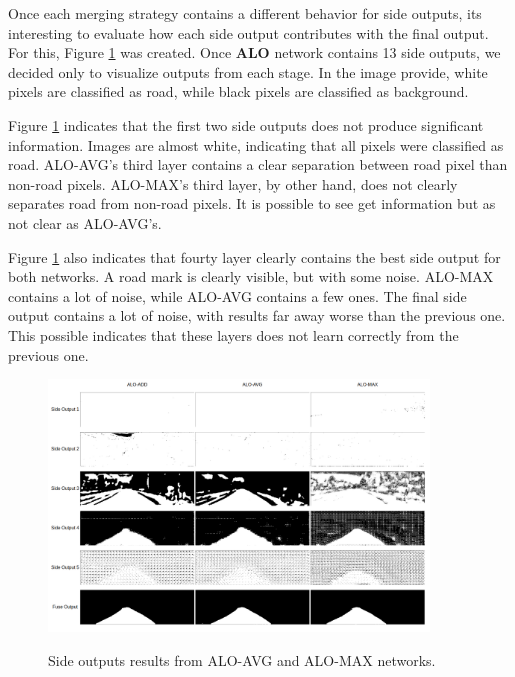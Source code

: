 Once each merging strategy contains a different behavior for side outputs, its interesting to evaluate how each side output contributes with the final output. For this, Figure \ref{fig:side_outputs} was created. Once \textbf{ALO} network contains 13 side outputs, we decided only to visualize outputs from each stage. In the image provide, white pixels are classified as road, while black pixels are classified as background.

Figure \ref{fig:side_outputs} indicates that the first two side outputs does not produce significant information. Images are almost white, indicating that all pixels were classified as road. ALO-AVG's third layer contains a clear separation between road pixel than non-road pixels. ALO-MAX's third layer, by other hand, does not clearly separates road from non-road pixels. It is possible to see get information but as not clear as ALO-AVG's.

Figure \ref{fig:side_outputs} also indicates that fourty layer clearly contains the best side output for both networks. A road mark is clearly visible, but with some noise. ALO-MAX contains a lot of noise, while ALO-AVG contains a few ones. The final side output contains a lot of noise, with results far away worse than the previous one. This possible indicates that these layers does not learn correctly from the previous one.

{\color{red}{Talvez adicionar artigo do Bengio, indicando que é difícil treinar as últimas camadas - tem nos slides do Zenilton de Deep Learning}}

\begin{figure}
  \caption{Side outputs results from ALO-AVG and ALO-MAX networks. \color{red}{Acho q devo treinar a rede ALO-ADD para exibir a saída lateral, melhorando a discussão}}
  \centering
  \includegraphics[width=0.9\textwidth]{figures/falreis/side_outputs.png}
  \label{fig:side_outputs}
\end{figure}

